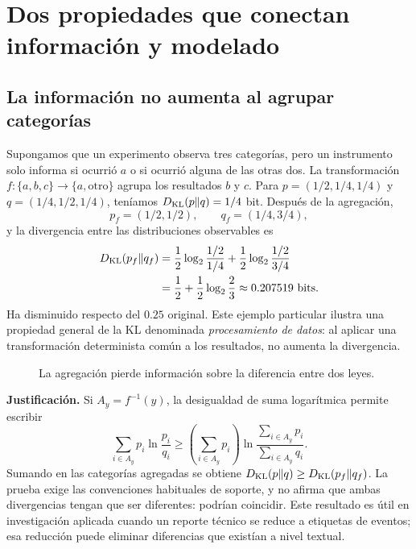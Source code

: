 \chapter*{Dos propiedades que conectan información y modelado}

\section*{La información no aumenta al agrupar categorías}
Supongamos que un experimento observa tres categorías, pero un instrumento
solo informa si ocurrió $a$ o si ocurrió alguna de las otras dos.
La transformación $f: \{a,b,c\}\to\{a,\mathrm{otro}\}$ agrupa
los resultados $b$ y $c$. Para
$p=(1/2,1/4,1/4)$ y $q=(1/4,1/2,1/4)$, teníamos
$D_{\rm KL}(p\|q)=1/4$ bit. Después de la agregación,
\[
 p_f=(1/2,1/2),\qquad q_f=(1/4,3/4),
\]
y la divergencia entre las distribuciones observables es
\[
\begin{split}
D_{\rm KL}(p_f\|q_f)
&=\frac12\log_2\frac{1/2}{1/4}
+\frac12\log_2\frac{1/2}{3/4}\\
&=\frac12+\frac12\log_2\frac23
\approx0.207519\ \text{bits}.
\end{split}
\]
Ha disminuido respecto del $0.25$ original. Este ejemplo particular
ilustra una propiedad general de la KL denominada \emph{procesamiento de
datos}: al aplicar una transformación determinista común a los
resultados, no aumenta la divergencia.

\begin{figure}[H]\centering
{}
\caption{La agregación pierde información sobre la diferencia entre dos leyes.}
\end{figure}

\textbf{Justificación.} Si $A_y=f^{-1}(y)$, la desigualdad de suma logarítmica
permite escribir
\[
\sum_{i\in A_y}p_i\ln\frac{p_i}{q_i}
\ge\left(\sum_{i\in A_y}p_i\right)
\ln\frac{\sum_{i\in A_y}p_i}{\sum_{i\in A_y}q_i}.
\]
Sumando en las categorías agregadas se obtiene
$D_{\rm KL}(p\|q)\ge D_{\rm KL}(p_f\|q_f)$.
La prueba exige las convenciones habituales de soporte, y no afirma
que ambas divergencias tengan que ser diferentes: podrían coincidir.
Este resultado es útil en investigación aplicada cuando un reporte
técnico se reduce a etiquetas de eventos; esa reducción puede eliminar
diferencias que existían a nivel textual.


